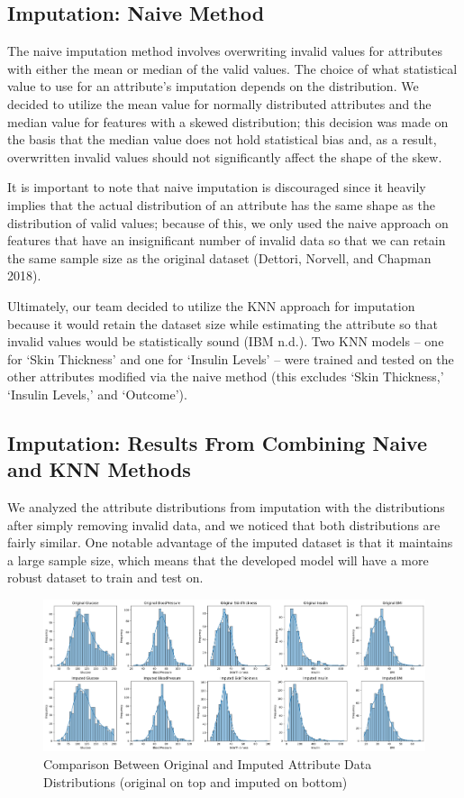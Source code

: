 \documentclass[journal]{IEEEtran}
\begin{document}
\subsection{Imputation: Naive Method}

The naive imputation method involves overwriting invalid values for attributes with either the mean or median of the valid values. The choice of what statistical value to use for an attribute’s imputation depends on the distribution. We decided to utilize the mean value for normally distributed attributes and the median value for features with a skewed distribution; this decision was made on the basis that the median value does not hold statistical bias and, as a result, overwritten invalid values should not significantly affect the shape of the skew.

It is important to note that naive imputation is discouraged since it heavily implies that the actual distribution of an attribute has the same shape as the distribution of valid values; because of this, we only used the naive approach on features that have an insignificant number of invalid data so that we can retain the same sample size as the original dataset (Dettori, Norvell, and Chapman 2018).

Ultimately, our team decided to utilize the KNN approach for imputation because it would retain the dataset size while estimating the attribute so that invalid values would be statistically sound (IBM n.d.). Two KNN models – one for ‘Skin Thickness’ and one for ‘Insulin Levels’ – were trained and tested on the other attributes modified via the naive method (this excludes ‘Skin Thickness,’ ‘Insulin Levels,’ and ‘Outcome’).

\subsection{Imputation: Results From Combining Naive and KNN Methods}

We analyzed the attribute distributions from imputation with the distributions after simply removing invalid data, and we noticed that both distributions are fairly similar. One notable advantage of the imputed dataset is that it maintains a large sample size, which means that the developed model will have a more robust dataset to train and test on.

\begin{figure}
    \centering
    \includegraphics[width=1\linewidth]{original_vs_imputed_dist_shape.png}
    \caption{Comparison Between Original and Imputed Attribute Data Distributions (original on top and imputed on bottom)}
    \label{fig:enter-label}
\end{figure}
\end{document}
